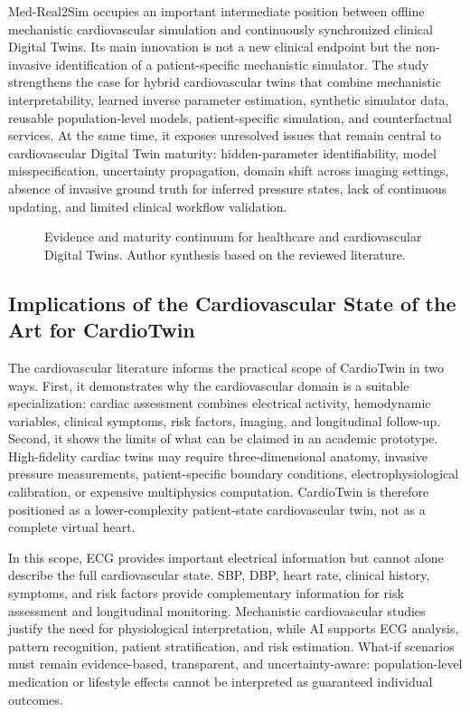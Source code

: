 Med-Real2Sim occupies an important intermediate position between offline mechanistic cardiovascular simulation and continuously synchronized clinical Digital Twins. Its main innovation is not a new clinical endpoint but the non-invasive identification of a patient-specific mechanistic simulator. The study strengthens the case for hybrid cardiovascular twins that combine mechanistic interpretability, learned inverse parameter estimation, synthetic simulator data, reusable population-level models, patient-specific simulation, and counterfactual services. At the same time, it exposes unresolved issues that remain central to cardiovascular Digital Twin maturity: hidden-parameter identifiability, model misspecification, uncertainty propagation, domain shift across imaging settings, absence of invasive ground truth for inferred pressure states, lack of continuous updating, and limited clinical workflow validation.

\begin{figure}[H]
    \centering
    \resizebox{0.98\textwidth}{!}{}
    \caption{Evidence and maturity continuum for healthcare and cardiovascular Digital Twins. Author synthesis based on the reviewed literature.}
    \label{fig:dt_evidence_maturity_continuum}
\end{figure}

\subsection{Implications of the Cardiovascular State of the Art for CardioTwin}
The cardiovascular literature informs the practical scope of CardioTwin in two ways. First, it demonstrates why the cardiovascular domain is a suitable specialization: cardiac assessment combines electrical activity, hemodynamic variables, clinical symptoms, risk factors, imaging, and longitudinal follow-up. Second, it shows the limits of what can be claimed in an academic prototype. High-fidelity cardiac twins may require three-dimensional anatomy, invasive pressure measurements, patient-specific boundary conditions, electrophysiological calibration, or expensive multiphysics computation. CardioTwin is therefore positioned as a lower-complexity patient-state cardiovascular twin, not as a complete virtual heart.

In this scope, ECG provides important electrical information but cannot alone describe the full cardiovascular state. SBP, DBP, heart rate, clinical history, symptoms, and risk factors provide complementary information for risk assessment and longitudinal monitoring. Mechanistic cardiovascular studies justify the need for physiological interpretation, while AI supports ECG analysis, pattern recognition, patient stratification, and risk estimation. What-if scenarios must remain evidence-based, transparent, and uncertainty-aware: population-level medication or lifestyle effects cannot be interpreted as guaranteed individual outcomes.

